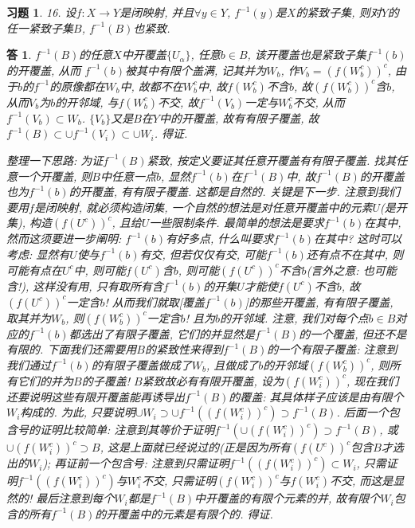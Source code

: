 \documentclass{ctexart}%
\newtheorem*{exercise}{习题}
\newtheorem*{solution}{答}
\theoremstyle{definition}
\theoremstyle{remark}
\begin{document}
\begin{exercise}16. 设$f:X\rightarrow Y$是闭映射, 并且$\forall y\in Y$, $f^{-1}(y)$是$X$的紧致子集, 则对$Y$的任一紧致子集$B$, $f^{-1}(B)$也紧致.
\end{exercise}
\begin{solution}
$f^{-1}(B)$的任意$X$中开覆盖$\{U_\alpha\}$, 任意$b\in B$, 该开覆盖也是紧致子集$f^{-1}(b)$的开覆盖, 从而
$f^{-1}(b)$被其中有限个盖满, 记其并为$W_b$, 作$V_b=(f(W^c_b))^c$, 由于$b$的$f^{-1}$的原像都在$W_b$中, 故都不在$W^c_b$中, 故$f(W^c_b)$不含$b$, 故$(f(W^c_b))^c$含$b$, 从而$V_b$为$b$的开邻域, 与$f(W^c_b)$不交, 故$f^{-1}(V_b)$一定与$W^c_b$不交, 从而$f^{-1}(V_b)\subset W_b$.  $\{V_b\}$又是$B$在$Y$中的开覆盖, 故有有限子覆盖, 故$f^{-1}(B)\subset \cup f^{-1}(V_i)\subset \cup W_i$. 得证.

整理一下思路: 为证$f^{-1}(B)$紧致, 按定义要证其任意开覆盖有有限子覆盖. 找其任意一个开覆盖, 则$B$中任意一点$b$, 显然$f^{-1}(b)$在$f^{-1}(B)$中, 故$f^{-1}(B)$的开覆盖也为$f^{-1}(b)$的开覆盖, 有有限子覆盖. 这都是自然的. 关键是下一步. 注意到我们要用$f$是闭映射, 就必须构造闭集, 一个自然的想法是对任意开覆盖中的元素$U$(是开集), 构造$(f(U^c))^c$, 且给$U$一些限制条件. 最简单的想法是要求$f^{-1}(b)$在其中, 然而这须要进一步阐明: $f^{-1}(b)$有好多点, 什么叫要求$f^{-1}(b)$在其中? 这时可以考虑: 显然有$U$使与$f^{-1}(b)$有交, 但若仅仅有交, 可能$f^{-1}(b)$还有点不在其中, 则可能有点在$U^c$中, 则可能$f(U^c)$含$b$, 则可能$(f(U^c))^c$不含$b$(言外之意: 也可能含!), 这样没有用, 只有取所有含$f^{-1}(b)$的开集$U$才能使$f(U^c)$不含$b$, 故$(f(U^c))^c$一定含$b$! 从而我们就取[覆盖$f^{-1}(b)$]的那些开覆盖, 有有限子覆盖, 取其并为$W_b$, 则$(f(W^c_b))^c$一定含$b$! 且为$b$的开邻域.  注意, 我们对每个点$b\in B$对应的$f^{-1}(b)$都选出了有限子覆盖, 它们的并显然是$f^{-1}(B)$的一个覆盖, 但还不是有限的. 下面我们还需要用$B$的紧致性来得到$f^{-1}(B)$的一个有限子覆盖: 注意到我们通过$f^{-1}(b)$的有限子覆盖做成了$W_b$, 且做成了$b$的开邻域$(f(W^c_b))^c$, 则所有它们的并为$B$的子覆盖! $B$紧致故必有有限开覆盖, 设为$(f(W^c_i))^c$, 现在我们还要说明这些有限开覆盖能再诱导出$f^{-1}(B)$的覆盖: 其具体样子应该是由有限个$W_i$构成的. 为此, 只要说明$\cup W_i \supset \cup f^{-1}((f(W^c_i))^c)\supset f^{-1}(B)$. 后面一个包含号的证明比较简单: 注意到其等价于证明$f^{-1}(\cup (f(W^c_i))^c)\supset f^{-1}(B)$, 或$\cup (f(W^c_i))^c\supset B$, 这是上面就已经说过的(正是因为所有$(f(U^c))^c$包含$B$才选出的$W_i$); 再证前一个包含号: 注意到只需证明$f^{-1}((f(W^c_i))^c)\subset W_i$, 只需证明$f^{-1}((f(W^c_i))^c)$与$W^c_i$不交, 只需证明$(f(W^c_i))^c$与$f(W^c_i)$不交, 而这是显然的! 最后注意到每个$W_i$都是$f^{-1}(B)$中开覆盖的有限个元素的并, 故有限个$W_i$包含的所有$f^{-1}(B)$的开覆盖中的元素是有限个的. 得证. 
\end{solution}
\end{document}
